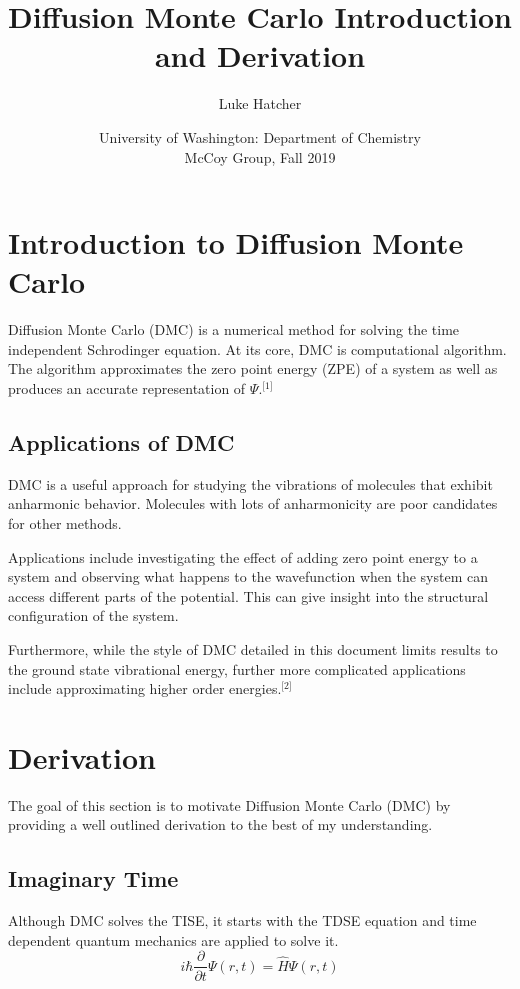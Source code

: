 \documentclass{article}
\begin{document}
\title{Diffusion Monte Carlo Introduction and Derivation}
\author{Luke Hatcher}
\date{University of Washington: Department of Chemistry \\ McCoy Group, Fall 2019}

\maketitle

\section{Introduction to Diffusion Monte Carlo}
Diffusion Monte Carlo (DMC) is a numerical method for solving the time independent Schrodinger equation. At its core, DMC is computational algorithm. The algorithm approximates the zero point energy (ZPE) of a system as well as produces an accurate representation of $\Psi$.$^\text{[1]}$
\subsection{Applications of DMC}
DMC is a useful approach for studying the vibrations of molecules that exhibit anharmonic behavior. Molecules with lots of anharmonicity are poor candidates for other methods.  

Applications include investigating the effect of adding zero point energy to a system and observing what happens to the wavefunction when the system can access different parts of the potential. This can give insight into the structural configuration of the system. 

Furthermore, while the style of DMC detailed in this document limits results to the ground state vibrational energy, further more complicated applications include approximating higher order energies.$^\text{[2]}$

\section{Derivation}
The goal of this section is to motivate Diffusion Monte Carlo (DMC) by providing a well outlined derivation to the best of my understanding.
\subsection{Imaginary Time}
Although DMC solves the TISE, it starts with the TDSE equation and time dependent quantum mechanics are applied to solve it.
\begin{equation} \label{eqn}
{i\hbar\frac{\partial}{\partial t}}\Psi(r,t)=\hat{H}{\Psi(r,t)}
\end{equation}
\end{document}
